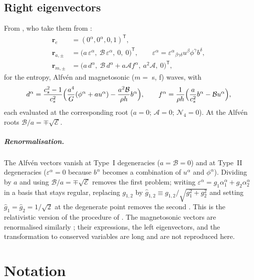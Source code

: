 \documentclass[11pt,a4paper,oneside,openany]{book}
\newcommand{\textcite}{\citet}
\newcommand{\parencite}{\citep}
\theoremstyle{definition}
\theoremstyle{plain}
\theoremstyle{remark}
\newcommand{\calB}{\mathcal{B}}
\newcommand{\calA}{\mathcal{A}}
\newcommand{\calN}{\mathcal{N}}
\begin{document}
\section{Right eigenvectors}

From \textcite[eqs.~46--50]{Anton2010}, who take them from \textcite{Anile1989}:
\begin{align}
\bm r_e&=(0^\alpha,0^\alpha,0,1)^{\mathsf T}, \\
\bm r_{a,\pm}&=\bigl(a\,\varepsilon^\alpha,\ \calB\,\varepsilon^\alpha,\ 0,\ 0\bigr)^{\mathsf T},
\qquad \varepsilon^\alpha=\varepsilon^\alpha{}_{\beta\gamma\delta}u^\beta\phi^\gamma b^\delta, \\
\bm r_{m,\pm}&=\bigl(a\,d^\alpha,\ \calB\,d^\alpha+a\calA f^\alpha,\ a^2\calA,\ 0\bigr)^{\mathsf T},
\end{align}
for the entropy, Alfvén and magnetosonic ($m=$ s, f) waves, with
\begin{equation}
d^\alpha=\frac{c_s^2-1}{c_s^2}\Bigl(\frac{a^4}{G}(\phi^\alpha+au^\alpha)-\frac{a^2\calB}{\rho h}b^\alpha\Bigr),
\qquad
f^\alpha=\frac{1}{\rho h}\Bigl(\frac{a}{c_s^2}b^\alpha-\calB u^\alpha\Bigr),
\end{equation}
each evaluated at the corresponding root ($a=0$; $\calA=0$; $\calN_4=0$). At the Alfvén roots
$\calB/a=\mp\sqrt{\mathcal E}$.

\paragraph{Renormalisation.} The Alfvén vectors vanish at Type~I degeneracies ($a=\calB=0$)
and at Type~II degeneracies ($\varepsilon^\alpha=0$ because $b^\alpha$ becomes a combination
of $u^\alpha$ and $\phi^\alpha$). Dividing by $a$ and using $\calB/a=\mp\sqrt{\mathcal E}$ removes
the first problem; writing $\varepsilon^\alpha=g_1\alpha^\alpha_1+g_2\alpha^\alpha_2$ in a
basis that stays regular, replacing $g_{1,2}$ by $\hat g_{1,2}\equiv g_{1,2}/\sqrt{g_1^2+g_2^2}$
and setting $\hat g_1=\hat g_2=1/\sqrt2$ at the degenerate point removes the second
\parencite[eqs.~52--67]{Anton2010}.
This is the relativistic version of the procedure of \textcite{BrioWu1988}. The magnetosonic
vectors are renormalised similarly \parencite[\S3.3.2]{Anton2010}; their expressions, the left
eigenvectors, and the transformation to conserved variables are long and are not reproduced
here.

\chapter{Notation}\label{app:notation}
\end{document}

